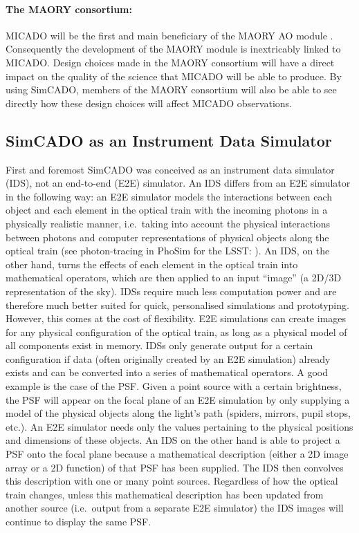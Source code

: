 \paragraph{The MAORY consortium:} MICADO will be the first and main beneficiary of the MAORY AO module \citep{maory}. Consequently the development of the MAORY module is inextricably linked to MICADO. Design choices made in the MAORY consortium will have a direct impact on the quality of the science that MICADO will be able to produce. By using SimCADO, members of the MAORY consortium will also be able to see directly how these design choices will affect MICADO observations.
  

\subsection{SimCADO as an Instrument Data Simulator}
\label{subsec:IDS}

First and foremost SimCADO was conceived as an instrument data simulator (IDS), not an end-to-end (E2E) simulator. An IDS differs from an E2E simulator in the following way: an E2E simulator models the interactions between each object and each element in the optical train with the incoming photons in a physically realistic manner, i.e.\ taking into account the physical interactions between photons and computer representations of physical objects along the optical train (see photon-tracing in PhoSim for the LSST: \citealt{phosim}). An IDS, on the other hand, turns the effects of each element in the optical train into mathematical operators, which are then applied to an input ``image'' (a 2D/3D representation of the sky). IDSs require much less computation power and are therefore much better suited for quick, personalised simulations and prototyping. However, this comes at the cost of flexibility. E2E simulations can create images for any physical configuration of the optical train, as long as a physical model of all components exist in memory. IDSs only generate output for a certain configuration if data (often originally created by an E2E simulation) already exists and can be converted into a series of mathematical operators. A good example is the case of the PSF. Given a point source with a certain brightness, the PSF will appear on the focal plane of an E2E simulation by only supplying a model of the physical objects along the light's path (spiders, mirrors, pupil stops, etc.). An E2E simulator needs only the values pertaining to the physical positions and dimensions of these objects. An IDS on the other hand is able to project a PSF onto the focal plane because a mathematical description (either a 2D image array or a 2D function) of that PSF has been supplied. The IDS then convolves this description with one or many point sources. Regardless of how the optical train changes, unless this mathematical description has been updated from another source (i.e.\ output from a separate E2E simulator) the IDS images will continue to display the same PSF.


